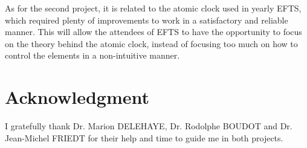 \documentclass[a4paper,12pt]{article}
\begin{document}
As for the second project, it is related to the atomic clock used in yearly EFTS, which required plenty of improvements to work in a satisfactory and reliable manner. This will allow the attendees of EFTS to have the opportunity to focus on the theory behind the atomic clock, instead of focusing too much on how to control the elements in a non-intuitive manner. %
\section{Acknowledgment}
I gratefully thank Dr. Marion DELEHAYE, Dr. Rodolphe BOUDOT and Dr. Jean-Michel FRIEDT for their help and time to guide me in both projects.
\end{document}
